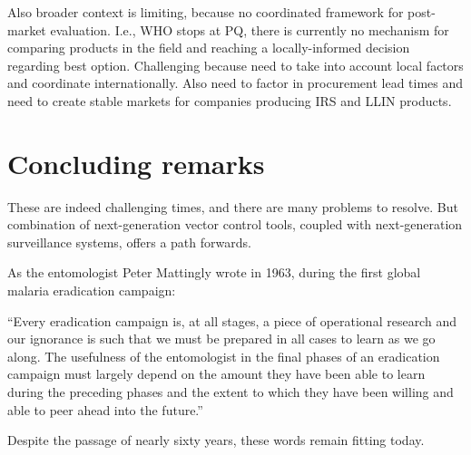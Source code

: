 \documentclass[a4paper,11pt,abstracton,hidelinks]{scrartcl}
\begin{document}
Also broader context is limiting, because no coordinated framework for post-market evaluation.
%
I.e., WHO stops at PQ, there is currently no mechanism for comparing products in the field and reaching a locally-informed decision regarding best option.
%
Challenging because need to take into account local factors and coordinate internationally.
%
Also need to factor in procurement lead times and need to create stable markets for companies producing IRS and LLIN products.


\section{Concluding remarks}\label{sec:conclusions}


These are indeed challenging times, and there are many problems to resolve.
But combination of next-generation vector control tools, coupled with next-generation surveillance systems, offers a path forwards.


As the entomologist Peter Mattingly wrote in 1963, during the first global malaria eradication campaign:


\begin{displayquote}
``Every eradication campaign is, at all stages, a piece of operational research and our ignorance is such that we must be prepared in all cases to learn as we go along. The usefulness of the entomologist in the final phases of an eradication campaign must largely depend on the amount they have been able to learn during the preceding phases and the extent to which they have been willing and able to peer ahead into the future.''
\end{displayquote}


Despite the passage of nearly sixty years, these words remain fitting today.


\printbibliography
\end{document}
